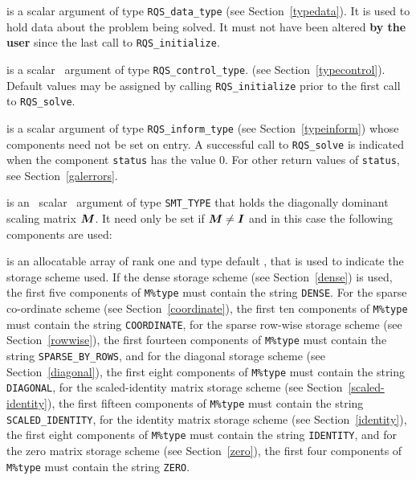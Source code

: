 \documentclass{galahad}
\newcommand{\packagename}{RQS}
\begin{document}
\begin{description}
 is a scalar \intentinout argument of type
{\tt \packagename\_data\_type}
(see Section~\ref{typedata}). It is used to hold data about the problem being
solved. It must not have been altered {\bf by the user} since the last call to
{\tt \packagename\_initialize}.

 is a scalar \intentin\ argument of type
{\tt \packagename\_control\_type}.
(see Section~\ref{typecontrol}).
Default values may be assigned by calling {\tt \packagename\_initialize}
prior to the first call to {\tt \packagename\_solve}.

 is a scalar \intentinout argument of type
{\tt \packagename\_inform\_type}
(see Section~\ref{typeinform})
whose components need not be set on entry.
A successful call to
{\tt \packagename\_solve}
is indicated when the  component {\tt status} has the value 0.
For other return values of {\tt status}, see Section~\ref{galerrors}.

 is an \optional\ scalar \intentin\ argument of type {\tt SMT\_TYPE}
that holds the diagonally dominant scaling matrix ${\bm{M}}$. It need only be set
if ${\bm{M}} \neq {\bm{I}}$ and in this case the following components are used:

\begin{description}

 is an allocatable array of rank one and type default
\character, that
is used to indicate the storage scheme used. If the dense storage scheme
(see Section~\ref{dense}) is used,
the first five components of {\tt M\%type} must contain the
string {\tt DENSE}.
For the sparse co-ordinate scheme (see Section~\ref{coordinate}),
the first ten components of {\tt M\%type} must contain the
string {\tt COORDINATE},
for the sparse row-wise storage scheme (see Section~\ref{rowwise}),
the first fourteen components of {\tt M\%type} must contain the
string {\tt SPARSE\_BY\_ROWS},
and for the diagonal storage scheme (see Section~\ref{diagonal}),
the first eight components of {\tt M\%type} must contain the
string {\tt DIAGONAL},
for the scaled-identity matrix storage scheme
(see Section~\ref{scaled-identity}),
the first fifteen components of {\tt M\%type} must contain the
string {\tt SCALED\_IDENTITY},
for the identity matrix storage scheme
(see Section~\ref{identity}),
the first eight components of {\tt M\%type} must contain the
string {\tt IDENTITY}, and
for the zero matrix storage scheme
(see Section~\ref{zero}),
the first four components of {\tt M\%type} must contain the
string {\tt ZERO}.


\end{description}
\end{description}
\end{document}
